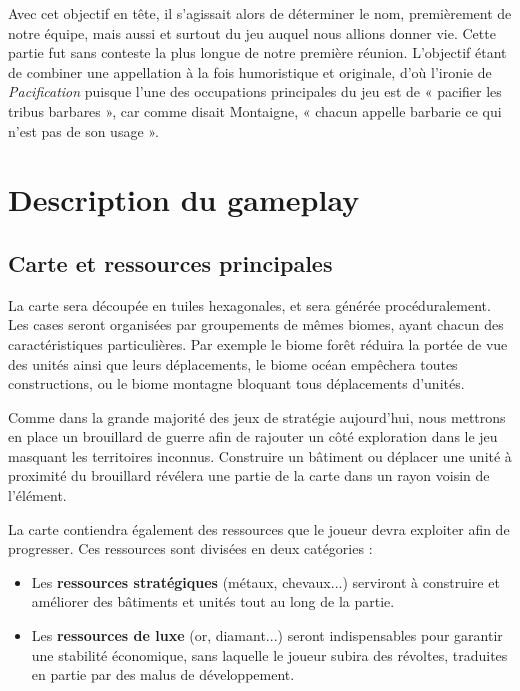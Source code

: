 \documentclass[12pt]{report}
\begin{document}
Avec cet objectif en tête, il s’agissait alors de déterminer le nom, premièrement de notre équipe, mais aussi et surtout du jeu auquel nous allions donner vie. Cette partie fut sans conteste la plus longue de notre première réunion. L’objectif étant de combiner une appellation à la fois humoristique et originale, d’où l’ironie de \textit{Pacification} puisque l’une des occupations principales du jeu est de « pacifier les tribus barbares », car comme disait Montaigne, « chacun appelle barbarie ce qui n’est pas de son usage ».

\chapter{Description du gameplay}

\section{Carte et ressources principales}

La carte sera découpée en tuiles hexagonales, et sera générée procéduralement. Les cases seront organisées par groupements de mêmes biomes, ayant chacun des caractéristiques particulières. Par exemple le biome forêt réduira la portée de vue des unités ainsi que leurs déplacements, le biome océan empêchera toutes constructions, ou le biome montagne bloquant tous déplacements d'unités.

Comme dans la grande majorité des jeux de stratégie aujourd'hui, nous mettrons en place un brouillard de guerre afin de rajouter un côté exploration dans le jeu masquant les territoires inconnus. Construire un bâtiment ou déplacer une unité à proximité du brouillard révélera une partie de la carte dans un rayon voisin de l’élément.

La carte contiendra également des ressources que le joueur devra exploiter afin de progresser. Ces ressources sont divisées en deux catégories :

\begin{itemize}[label=\textbullet]
    \item Les \textbf{ressources stratégiques} (métaux, chevaux...) serviront à cons\-truire et améliorer des bâtiments et unités tout au long de la partie. 
    \item Les \textbf{ressources de luxe} (or, diamant...) seront indispensables pour garantir une stabilité économique, sans laquelle le joueur subira des révoltes, traduites en partie par des malus de développement.
\end{itemize}
\end{document}
